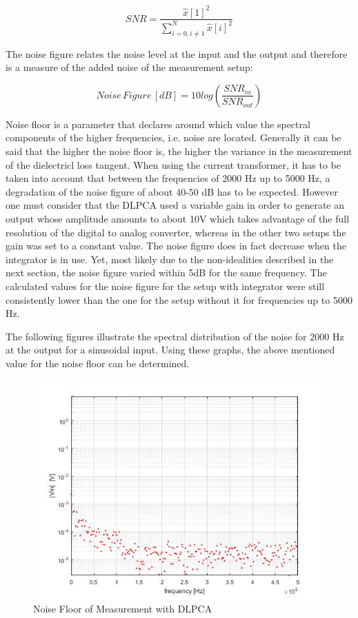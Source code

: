 \begin{equation}
SNR=\frac{\hat{x}[1]^2}{\sum\limits_{i=0,i\neq1}^{N}\hat{x}[i]^2}
\end{equation}

The noise figure relates the noise level at the input and the output and therefore is a measure of the added noise of the measurement setup:

\begin{equation}
 Noise\,Figure\, [dB]=10log\left(\frac{SNR_{in}}{SNR_{out}}\right)
\end{equation}

Noise floor is a parameter that declares around which value the spectral components of the higher frequencies, i.e. noise are located. Generally it can be said that the higher the noise floor is,
the higher the variance in the measurement of the dielectricl loss tangent.\cite{FaerberMVISS}
When using the current transformer, it has to be taken into account that between the frequencies of 2000 Hz up to 5000 Hz, a degradation of the noise
figure of about 40-50 dB has to be expected. However one must consider that the DLPCA used a variable gain in order to generate an output whose amplitude amounts to about 10V which takes advantage of the full resolution of the 
digital to analog converter, whereas in the other two setups the gain was set to a constant value.
The noise figure does in fact decrease when the integrator is in use. Yet, most likely due to the non-idealities described in the next section, the noise figure varied within 5dB for the same frequency. 
The calculated values for the noise figure for the setup with integrator were still consistently lower than the one for the setup without it for frequencies up to 5000 Hz.

The following figures illustrate the spectral distribution of the noise for 2000 Hz at the output for a sinusoidal input. Using these graphs, the above mentioned value for the noise floor can be determined.


\begin{figure}[htbp]
 \centering
 \centerline{\includegraphics[scale=0.3]{figures/Results/NoiseFloor/DLPCA.jpg}}

\caption[Kurze Abbildungsbeschreibung]{Noise Floor of Measurement with DLPCA }
\label{fig.noisefloordlpca}
\end{figure}

